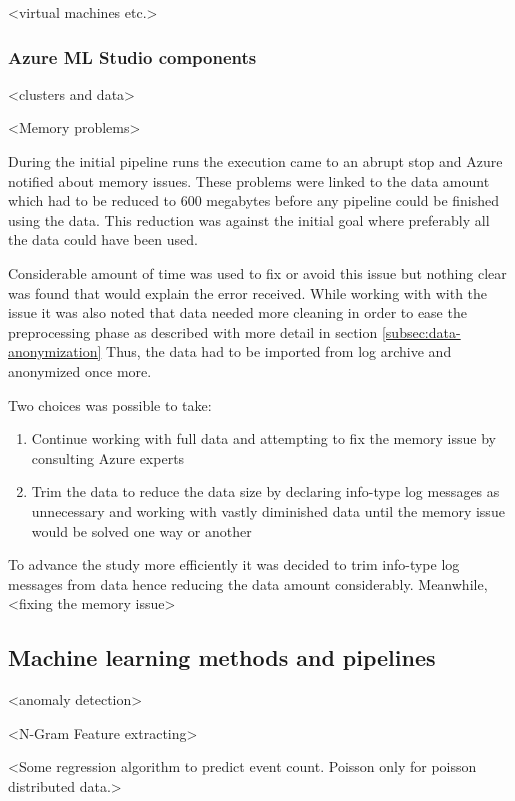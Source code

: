\documentclass[english, 12pt, a4paper, elec, utf8, a-1b, online]{aaltothesis}
\begin{document}
<virtual machines etc.>




\subsubsection*{Azure ML Studio components}
<clusters and data>

<Memory problems>

During the initial pipeline runs
the execution came to an abrupt stop
and Azure notified about memory issues.
These problems were linked to the data amount
which had to be reduced to 600 megabytes
before any pipeline could be finished using the data.
This reduction was against the initial goal
where preferably all the data could have been used.

Considerable amount of time was used
to fix or avoid this issue
but nothing clear was found
that would explain the error received.
While working with with the issue
it was also noted
that data needed more cleaning
in order to ease the preprocessing phase
as described with more detail in section \ref{subsec:data-anonymization}
Thus,
the data had to be imported from log archive
and anonymized once more.

Two choices was possible to take:
\begin{enumerate}
  \item Continue working with full data
  and attempting to fix the memory issue
  by consulting Azure experts
  \item  Trim the data to reduce the data size
  by declaring info-type log messages
  as unnecessary
  and working with vastly diminished data
  until the memory issue would be solved
  one way or another
\end{enumerate}

To advance the study more efficiently
it was decided to trim info-type log messages from data
hence reducing the data amount considerably.
Meanwhile,
<fixing the memory issue>

\subsection{Machine learning methods and pipelines}\label{subsec:machine-learning-methods-and-pipelines}

<anomaly detection>

<N-Gram Feature extracting>

<Some regression algorithm to predict event count.
Poisson only for poisson distributed data.>
\end{document}
